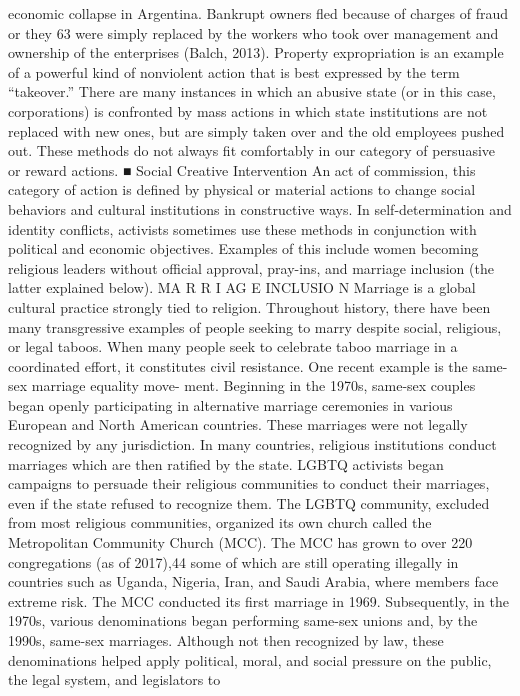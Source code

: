 \documentclass[twoside,a4paper,12pt,fleqn,openany]{extbook}
\begin{document}
economic collapse in Argentina. Bankrupt owners fled because of charges of fraud or they
63
were simply replaced by the workers who took over management and ownership of the
enterprises (Balch, 2013).
Property expropriation is an example of a powerful kind of nonviolent action that is best
expressed by the term “takeover.” There are many instances in which an abusive state (or in
this case, corporations) is confronted by mass actions in which state institutions are not
replaced with new ones, but are simply taken over and the old employees pushed out. These
methods do not always fit comfortably in our category of persuasive or reward actions.
■ Social Creative Intervention
An act of commission, this category of action is defined by physical or material actions to
change social behaviors and cultural institutions in constructive ways. In self-determination
and identity conflicts, activists sometimes use these methods in conjunction with political and
economic objectives. Examples of this include women becoming religious leaders without
official approval, pray-ins, and marriage inclusion (the latter explained below).
MA R R I AG E INCLUSIO N
Marriage is a global cultural practice strongly tied to religion. Throughout history, there have
been many transgressive examples of people seeking to marry despite social, religious, or
legal taboos. When many people seek to celebrate taboo marriage in a coordinated effort,
it constitutes civil resistance. One recent example is the same-sex marriage equality move-
ment. Beginning in the 1970s, same-sex couples began openly participating in alternative
marriage ceremonies in various European and North American countries. These marriages
were not legally recognized by any jurisdiction.
In many countries, religious institutions conduct marriages which are then ratified by the
state. LGBTQ activists began campaigns to persuade their religious communities to conduct
their marriages, even if the state refused to recognize them. The LGBTQ community, excluded
from most religious communities, organized its own church called the Metropolitan Community
Church (MCC). The MCC has grown to over 220 congregations (as of 2017),44 some of which
are still operating illegally in countries such as Uganda, Nigeria, Iran, and Saudi Arabia, where
members face extreme risk. The MCC conducted its first marriage in 1969. Subsequently, in
the 1970s, various denominations began performing same-sex unions and, by the 1990s,
same-sex marriages. Although not then recognized by law, these denominations helped
apply political, moral, and social pressure on the public, the legal system, and legislators to
\end{document}
